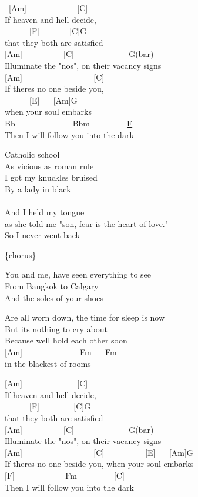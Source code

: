 \documentclass[
  letterpaper,
  twoside=false]{scrbook}
\begin{document}
~{[}Am{]} ~ ~ ~ ~ ~ ~ ~ {[}C{]} ~ ~\\
If heaven and hell decide, ~ ~ ~\\
\hspace*{0.333em} ~ ~ ~ ~{[}F{]} ~ ~ ~ ~ {[}C{]}G\\
that they both are satisfied\\
{[}Am{]} ~ ~ ~ ~ ~ ~{[}C{]} ~ ~ ~ ~ ~ ~ ~ ~G(bar)\\
Illuminate the "no\textquotesingle s", on their vacancy signs\\
{[}Am{]} ~ ~ ~ ~ ~ ~ ~ ~ ~ ~ {[}C{]}\\
If there\textquotesingle s no one beside you,\\
\hspace*{0.333em} ~ ~ ~ ~{[}E{]} ~ ~{[}Am{]}G\\
when your soul embarks\\
Bb ~ ~ ~ ~ ~ ~ ~ ~ Bbm ~ ~ ~ ~ ~ \href{C\%20root\%20note}{F}\\
Then I will follow you into the dark

Catholic school\\
As vicious as roman rule\\
I got my knuckles bruised\\
By a lady in black\\
\hspace*{0.333em} ~\\
And I held my tongue\\
as she told me "son, fear is the heart of love."\\
So I never went back

\{chorus\}

You and me, have seen everything to see\\
From Bangkok to Calgary ~\\
And the soles of your shoes

Are all worn down, the time for sleep is now\\
But it\textquotesingle s nothing to cry about ~\\
Because we\textquotesingle ll hold each other soon\\
{[}Am{]} ~ ~ ~ ~ ~ ~ ~ ~ Fm ~ ~Fm\\
in the blackest of rooms

{[}Am{]} ~ ~ ~ ~ ~ ~ ~ ~{[}C{]} ~ ~\\
If heaven and hell decide,\\
\hspace*{0.333em} ~ ~ ~ ~{[}F{]} ~ ~ ~ ~ ~{[}C{]}G\\
that they both are satisfied\\
{[}Am{]} ~ ~ ~ ~ ~ ~{[}C{]} ~ ~ ~ ~ ~ ~ ~ ~G(bar)\\
Illuminate the "no\textquotesingle s", on their vacancy signs\\
{[}Am{]} ~ ~ ~ ~ ~ ~ ~ ~ ~ ~ {[}C{]} ~ ~ ~ ~ ~ ~{[}E{]} ~ ~{[}Am{]}G\\
If there\textquotesingle s no one beside you, when your soul embarks\\
{[}F{]} ~ ~ ~ ~ ~ ~ ~ Fm ~ ~ ~ ~ ~ {[}C{]} ~\\
Then I will follow you into the dark
\end{document}
